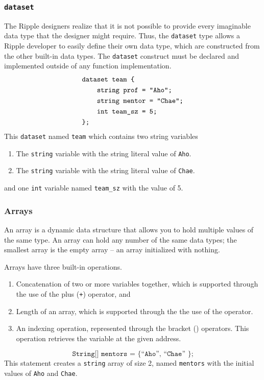 \documentclass{article}
\newcommand{\code}{\texttt}
\begin{document}
\subsubsection{\code{dataset}}
The Ripple designers realize that it is not possible to provide every imaginable data type that the designer might require. Thus, the \code{dataset} type allows a Ripple developer to easily define their own data type, which are constructed from the other built-in data types. The \code{dataset} construct must be declared and implemented outside of any function implementation.
\begin{align*}
&\code{dataset team \{ }                 \\
&\code{\qquad string prof = ``Aho'';}    \\
&\code{\qquad string mentor = ``Chae'';} \\
&\code{\qquad int team\_sz = 5;}         \\
&\code{\};} 
\end{align*}
This \code{dataset} named \code{team} which contains two string variables
\begin{enumerate}
\item The \code{string} variable with the string literal value of \code{Aho}.
\item The \code{string} variable with the string literal value of \code{Chae}.
\end{enumerate}
and one \code{int} variable named \code{team\_sz} with the value of 5.

\subsubsection{Arrays}
An array is a dynamic data structure that allows you to hold multiple values of the same type. An array can hold any number of the same data types; the smallest array is the empty array --  an array initialized with nothing.

Arrays have three built-in operations.
\begin{enumerate}
\item Concatenation of two or more variables together, which is supported through the use of the plus (\code{+}) operator, and
\item Length of an array, which is supported through the the use of the \code{\MVAt} operator.
\item An indexing operation, represented through the bracket (\code{\lbrack  \rbrack}) operators. This operation retrieves the variable at the given address.
\end{enumerate}
\[ \code{String[] mentors = \{ ``Aho'', ``Chae'' \};} \]
This statement creates a \code{string} array of size 2, named \code{mentors} with the initial values of \code{Aho} and \code{Chae}.
\end{document}
